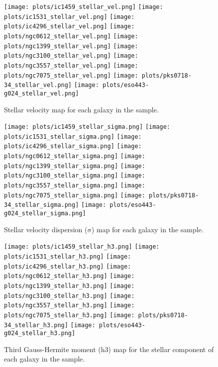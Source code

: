 \documentclass[fleqn,usenatbib,useAMS]{mnras}
\begin{document}
		\begin{figure*}
			\centering
			\texttt{[image: plots/ic1459\_stellar\_vel.png]}
			\texttt{[image: plots/ic1531\_stellar\_vel.png]}
			\texttt{[image: plots/ic4296\_stellar\_vel.png]}
			\texttt{[image: plots/ngc0612\_stellar\_vel.png]}
			\texttt{[image: plots/ngc1399\_stellar\_vel.png]}
			\texttt{[image: plots/ngc3100\_stellar\_vel.png]}
			\texttt{[image: plots/ngc3557\_stellar\_vel.png]}
			\texttt{[image: plots/ngc7075\_stellar\_vel.png]}
			\texttt{[image: plots/pks0718-34\_stellar\_vel.png]}
			\texttt{[image: plots/eso443-g024\_stellar\_vel.png]}
			\caption{Stellar velocity map for each galaxy in the sample.}
			\label{fig:stellar_vel}
		\end{figure*}

		\begin{figure*}
			\centering
			\texttt{[image: plots/ic1459\_stellar\_sigma.png]}
			\texttt{[image: plots/ic1531\_stellar\_sigma.png]}
			\texttt{[image: plots/ic4296\_stellar\_sigma.png]}
			\texttt{[image: plots/ngc0612\_stellar\_sigma.png]}
			\texttt{[image: plots/ngc1399\_stellar\_sigma.png]}
			\texttt{[image: plots/ngc3100\_stellar\_sigma.png]}
			\texttt{[image: plots/ngc3557\_stellar\_sigma.png]}
			\texttt{[image: plots/ngc7075\_stellar\_sigma.png]}
			\texttt{[image: plots/pks0718-34\_stellar\_sigma.png]}
			\texttt{[image: plots/eso443-g024\_stellar\_sigma.png]}
			\caption{Stellar velocity dispersion ($\mathrm{\sigma}$) map for each galaxy in the sample.}
			\label{fig:stellar_sigma}
		\end{figure*}


		\begin{figure*}
			\centering
			\texttt{[image: plots/ic1459\_stellar\_h3.png]}
			\texttt{[image: plots/ic1531\_stellar\_h3.png]}
			\texttt{[image: plots/ic4296\_stellar\_h3.png]}
			\texttt{[image: plots/ngc0612\_stellar\_h3.png]}
			\texttt{[image: plots/ngc1399\_stellar\_h3.png]}
			\texttt{[image: plots/ngc3100\_stellar\_h3.png]}
			\texttt{[image: plots/ngc3557\_stellar\_h3.png]}
			\texttt{[image: plots/ngc7075\_stellar\_h3.png]}
			\texttt{[image: plots/pks0718-34\_stellar\_h3.png]}
			\texttt{[image: plots/eso443-g024\_stellar\_h3.png]}
			\caption{Third Gauss-Hermite moment (h3) map for the stellar component of each galaxy in the sample.}
			\label{fig:stellar_h3}
		\end{figure*}
\end{document}
